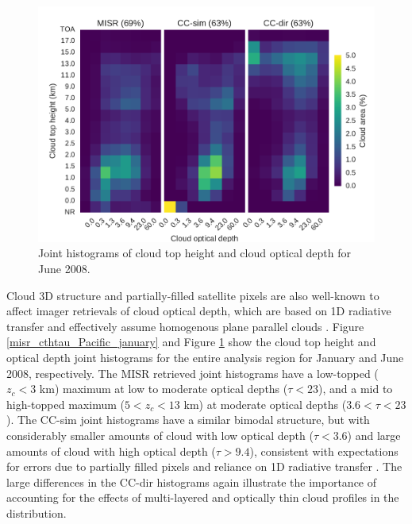 \begin{figure}
\centering
\includegraphics[width=\columnwidth]{graphics/misr_clmisr_Pacific_2008-06.pdf}
\caption{Joint histograms of cloud top height and cloud optical depth for June 2008.}
\label{misr_cthtau_Pacific_june}
\end{figure}

Cloud 3D structure and partially-filled satellite pixels are also well-known to affect imager retrievals of cloud optical depth, which are based on 1D radiative transfer and effectively assume homogenous plane parallel clouds \citep{yang_and_digirolamo_2008, evans_et_al_2008}. Figure \ref{misr_cthtau_Pacific_january} and Figure \ref{misr_cthtau_Pacific_june} show the cloud top height and optical depth joint histograms for the entire analysis region for January and June 2008, respectively. The MISR retrieved joint histograms have a low-topped ($z_c < 3$ km) maximum at low to moderate optical depths ($\tau < 23$), and a mid to high-topped maximum ($5 < z_c < 13$ km) at moderate optical depths ($3.6 < \tau < 23$). The CC-sim joint histograms have a similar bimodal structure, but with considerably smaller amounts of cloud with low optical depth ($\tau < 3.6$) and large amounts of cloud with high optical depth ($\tau > 9.4$), consistent with expectations for errors due to partially filled pixels and reliance on 1D radiative transfer \citep{marchand_et_al_2010}. The large differences in the CC-dir histograms again illustrate the importance of accounting for the effects of multi-layered and optically thin cloud profiles in the  distribution.

